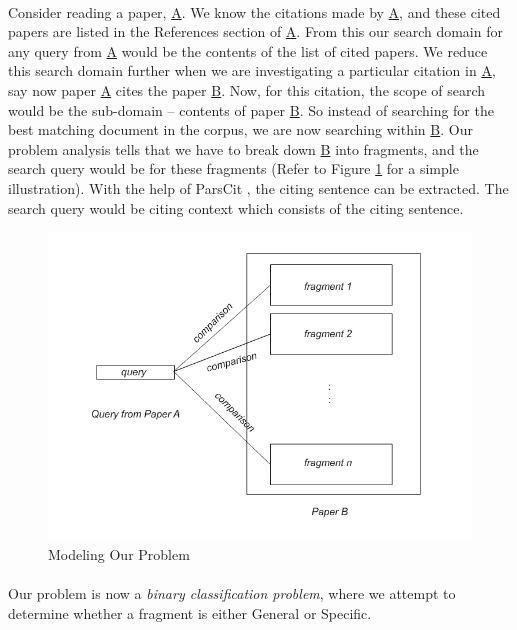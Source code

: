 \paragraph{}
Consider reading a paper, \url{A}. We know the citations made by \url{A}, and these cited papers are listed in the References section of \url{A}. From this our search domain for any query from \url{A} would be the contents of the list of cited papers. We reduce this search domain further when we are investigating a particular citation in \url{A}, say now paper \url{A} cites the paper \url{B}. Now, for this citation, the scope of search would be the sub-domain -- contents of paper \url{B}. So instead of searching for the best matching document in the corpus, we are now searching within \url{B}. Our problem analysis tells that we have to break down \url{B} into fragments, and the search query would be for these fragments (Refer to Figure \ref{fig:model} for a simple illustration). With the help of ParsCit \cite{parscit}, the citing sentence can be extracted. The search query would be citing context which consists of the citing sentence.

\begin{figure}[h]
  \centering
  \includegraphics[scale=0.50]{./model}
  \caption{Modeling Our Problem}
  \label{fig:model}
\end{figure}

\paragraph{}
Our problem is now a \textit{binary classification problem}, where we attempt to determine whether a fragment is either General or Specific.

